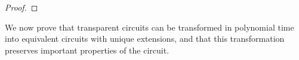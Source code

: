 \documentclass[../paper.tex]{subfiles}
\begin{document}
\begin{proof}
  

 
\end{proof}

We now prove that transparent circuits can be transformed in polynomial time
into equivalent circuits with unique extensions, and that this transformation
preserves important properties of the circuit.
\end{document}
